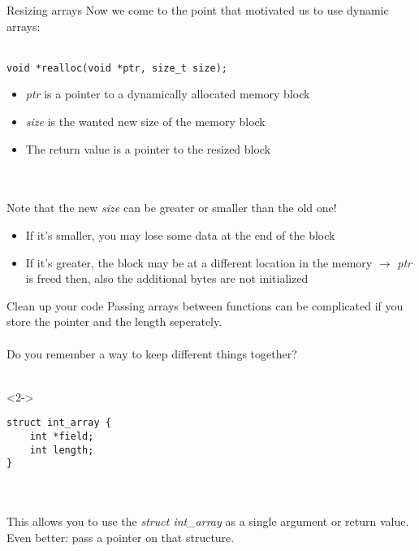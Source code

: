 \begin{frame}[fragile]{Resizing arrays}
	Now we come to the point that motivated us to use dynamic arrays:\\
	\ \\
	\begin{lstlisting}[numbers=none]
void *realloc(void *ptr, size_t size);
\end{lstlisting}
	\begin{itemize}
		\item \textit{ptr} is a pointer to a dynamically allocated memory block
		\item \textit{size} is the wanted new size of the memory block
		\item The return value is a pointer to the resized block
	\end{itemize} \ \\
	\ \\
	Note that the new \textit{size} can be greater or smaller than the old one!
	\begin{itemize}
		\item If it's smaller, you may lose some data at the end of the block
		\item If it's greater, the block may be at a different location in the memory $\rightarrow$ \textit{ptr} is freed then, also the additional bytes are not initialized
	\end{itemize}
\end{frame}
\begin{frame}[fragile]{Clean up your code}
	Passing arrays between functions can be complicated if you store the pointer and the length seperately.\\
	\ \\
	Do you remember a way to keep different things together?\\
	\ \\
	\begin{uncoverenv}<2->
		\begin{lstlisting}[numbers=none]
struct int_array {
	int *field;
	int length;
}
\end{lstlisting}\ \\
		\ \\
		This allows you to use the \textit{struct int\_array} as a single argument or return value. Even better: pass a pointer on that structure.
	\end{uncoverenv}
\end{frame}
